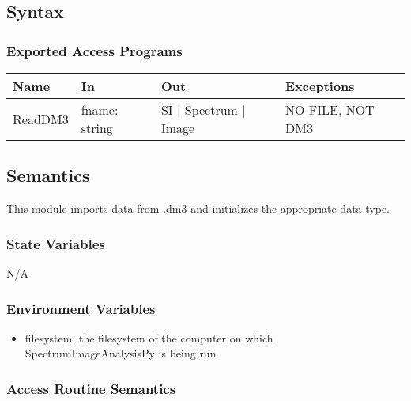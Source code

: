 \documentclass[12pt, titlepage]{article}
\newcommand{\progname}{SpectrumImageAnalysisPy}
\begin{document}
\subsection{Syntax}

\subsubsection{Exported Access Programs}

\begin{center}
\begin{tabular}{p{2cm} p{4cm} p{4cm} p{4cm}}
\hline
\textbf{Name} & \textbf{In} & \textbf{Out} & \textbf{Exceptions} \\
\hline
ReadDM3 & fname: string & SI $|$ Spectrum $|$ Image & NO FILE, NOT DM3 \\
\hline
\end{tabular}
\end{center}

\subsection{Semantics}
This module imports data from .dm3 and initializes the appropriate data type.

\subsubsection{State Variables}
N/A

\subsubsection{Environment Variables}
\begin{itemize}
\item filesystem: the filesystem of the computer on which \progname{} is being run
\end{itemize}
\subsubsection{Access Routine Semantics}
\end{document}
